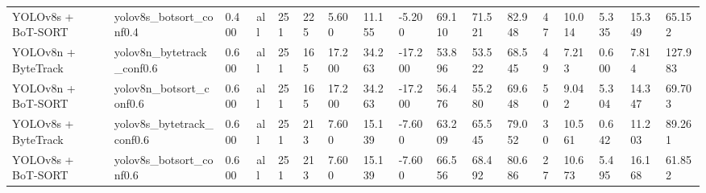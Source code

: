 \begin{tabular}{lllllllllllllllll}
YOLOv8s + BoT-SORT & yolov8s\_botsort\_conf0.4 & 0.400 & all & 251 & 225 & 5.600 & 11.155 & -5.200 & 69.110 & 71.521 & 82.948 & 47 & 10.014 & 5.335 & 15.349 & 65.152 \\
YOLOv8n + ByteTrack & yolov8n\_bytetrack\_conf0.6 & 0.600 & all & 251 & 165 & 17.200 & 34.263 & -17.200 & 53.896 & 53.522 & 68.545 & 49 & 7.213 & 0.600 & 7.814 & 127.983 \\
YOLOv8n + BoT-SORT & yolov8n\_botsort\_conf0.6 & 0.600 & all & 251 & 165 & 17.200 & 34.263 & -17.200 & 56.476 & 55.280 & 69.648 & 50 & 9.042 & 5.304 & 14.347 & 69.703 \\
YOLOv8s + ByteTrack & yolov8s\_bytetrack\_conf0.6 & 0.600 & all & 251 & 213 & 7.600 & 15.139 & -7.600 & 63.209 & 65.545 & 79.052 & 30 & 10.561 & 0.642 & 11.203 & 89.261 \\
YOLOv8s + BoT-SORT & yolov8s\_botsort\_conf0.6 & 0.600 & all & 251 & 213 & 7.600 & 15.139 & -7.600 & 66.556 & 68.492 & 80.686 & 27 & 10.673 & 5.495 & 16.168 & 61.852 \\
\bottomrule
\end{tabular}

